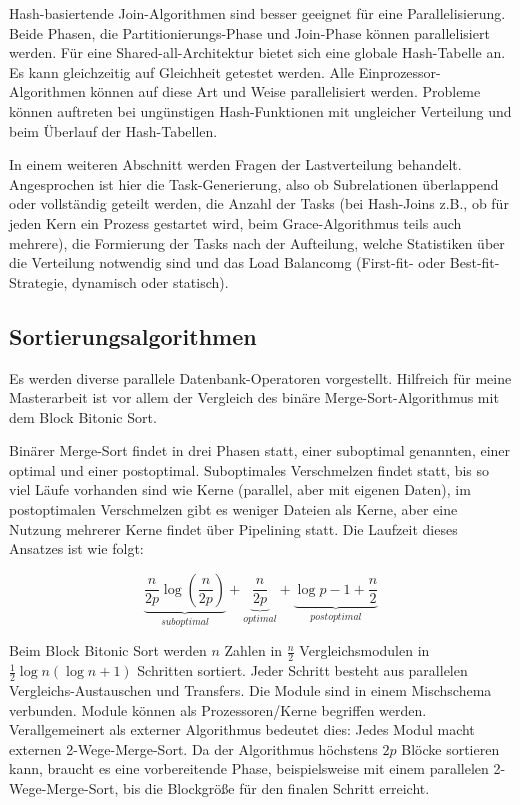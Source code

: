 \documentclass[a4paper,12pt,twoside]{article}
\begin{document}
Hash-basiertende Join-Algorithmen sind besser geeignet für eine Parallelisierung. Beide Phasen, die Partitionierungs-Phase und Join-Phase können parallelisiert werden. Für eine Shared-all-Architektur bietet sich eine globale Hash-Tabelle an. Es kann gleichzeitig auf Gleichheit getestet werden. Alle Einprozessor-Algorithmen können auf diese Art und Weise parallelisiert werden. Probleme können auftreten bei ungünstigen Hash-Funktionen mit ungleicher Verteilung und beim Überlauf der Hash-Tabellen.

In einem weiteren Abschnitt werden Fragen der Lastverteilung behandelt. Angesprochen ist hier die Task-Generierung, also ob Subrelationen überlappend oder vollständig geteilt werden, die Anzahl der Tasks (bei Hash-Joins z.B., ob für jeden Kern ein Prozess gestartet wird, beim Grace-Algorithmus teils auch mehrere), die Formierung der Tasks nach der Aufteilung, welche Statistiken über die Verteilung notwendig sind und das Load Balancomg (First-fit- oder Best-fit-Strategie, dynamisch oder statisch). 

\subsection{Sortierungsalgorithmen}

\textbf{}

Es werden diverse parallele Datenbank-Operatoren vorgestellt. Hilfreich für meine Masterarbeit ist vor allem der Vergleich des binäre Merge-Sort-Algorithmus mit dem Block Bitonic Sort.

Binärer Merge-Sort findet in drei Phasen statt, einer suboptimal genannten, einer optimal und einer postoptimal. Suboptimales Verschmelzen findet statt, bis so viel Läufe vorhanden sind wie Kerne (parallel, aber mit eigenen Daten), im postoptimalen Verschmelzen gibt es weniger Dateien als Kerne, aber eine Nutzung mehrerer Kerne findet über Pipelining statt. Die Laufzeit dieses Ansatzes ist wie folgt:

\[ \underbrace{\frac{n}{2p} \log \left( \frac{n}{2p} \right)}_{suboptimal} + \underbrace{\frac{n}{2p}}_{optimal} + \underbrace{\log p - 1 + \frac{n}{2}}_{postoptimal} \]

Beim Block Bitonic Sort werden $n$ Zahlen in $\frac{n}{2}$ Vergleichsmodulen in $\frac{1}{2} \log n (\log n +1)$ Schritten sortiert. Jeder Schritt besteht aus parallelen Vergleichs-Austauschen und Transfers. Die  Module sind in einem Mischschema verbunden. Module können als Prozessoren/Kerne begriffen werden. Verallgemeinert als externer Algorithmus bedeutet dies: Jedes Modul macht externen 2-Wege-Merge-Sort. Da der Algorithmus höchstens $2p$ Blöcke sortieren kann, braucht es eine vorbereitende Phase, beispielsweise mit einem parallelen 2-Wege-Merge-Sort, bis die Blockgröße für den finalen Schritt erreicht.
\end{document}

